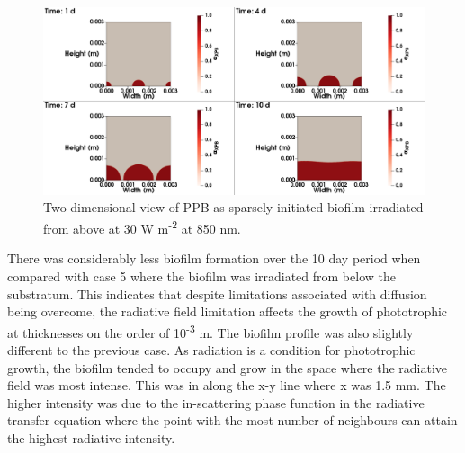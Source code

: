 \begin{figure}[H]
    \centering
    \hspace*{-1cm}\includegraphics[width=1.1\textwidth,height=0.4\textheight]{Chap4/methods/data/figures/case6_ppb_frac.png}
    \caption{Two dimensional view of PPB as sparsely initiated biofilm irradiated from above at 30 W m\textsuperscript{-2} at 850 nm.} 
    \label{fig:case6_ppb_frac}
\end{figure}
There was considerably less biofilm formation over the 10 day period when compared with case 5 where the biofilm was irradiated from below the substratum. This indicates that despite limitations associated with diffusion being overcome, the radiative field limitation affects the growth of phototrophic at thicknesses on the order of 10\textsuperscript{-3} m. The biofilm profile was also slightly different to the previous case. As radiation is a condition for phototrophic growth, the biofilm tended to occupy and grow in the space where the radiative field was most intense. This was in along the x-y line where x was 1.5 mm. The higher intensity was due to the in-scattering phase function in the radiative transfer equation where the point with the most number of neighbours can attain the highest radiative intensity. 







